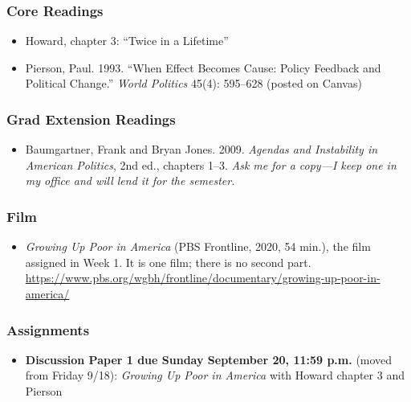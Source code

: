 \documentclass[12pt]{article}
\begin{document}
    \subsubsection*{Core Readings}
        \begin{itemize}
            \item Howard, chapter 3: ``Twice in a Lifetime''
            \item Pierson, Paul. 1993. ``When Effect Becomes Cause: Policy Feedback and Political Change.'' \emph{World Politics} 45(4): 595--628 (posted on Canvas)
        \end{itemize}
    \subsubsection*{Grad Extension Readings}
        \begin{itemize}
            \item Baumgartner, Frank and Bryan Jones. 2009. \emph{Agendas and Instability in American Politics}, 2nd ed., chapters 1--3. \emph{Ask me for a copy---I keep one in my office and will lend it for the semester.}
        \end{itemize}
    \subsubsection*{Film}
        \begin{itemize}
            \item \emph{Growing Up Poor in America} (PBS Frontline, 2020, 54 min.), the film assigned in Week 1. It is one film; there is no second part. \\
            \url{https://www.pbs.org/wgbh/frontline/documentary/growing-up-poor-in-america/}
        \end{itemize}
    \subsubsection*{Assignments}
        \begin{itemize}
            \item \textbf{Discussion Paper 1 due Sunday September 20, 11:59 p.m.} (moved from Friday 9/18): \emph{Growing Up Poor in America} with Howard chapter 3 and Pierson
        \end{itemize}
\end{document}
